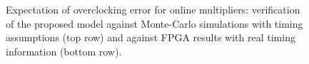 \documentclass{acm_proc_article-sp}
\begin{document}
\begin{figure}[t]
{\begin{minipage}{0.24\textwidth}
  \end{minipage}
  }\vspace{-2ex}
  \vspace{-2ex}
  \caption{Expectation of overclocking error for online multipliers: verification of the proposed model against Monte-Carlo simulations with timing assumptions (top row) and against FPGA results with real timing information (bottom row).}
  \label{Fig:ModelVerification}
  \vspace{-2ex}
\end{figure}
\end{document}
